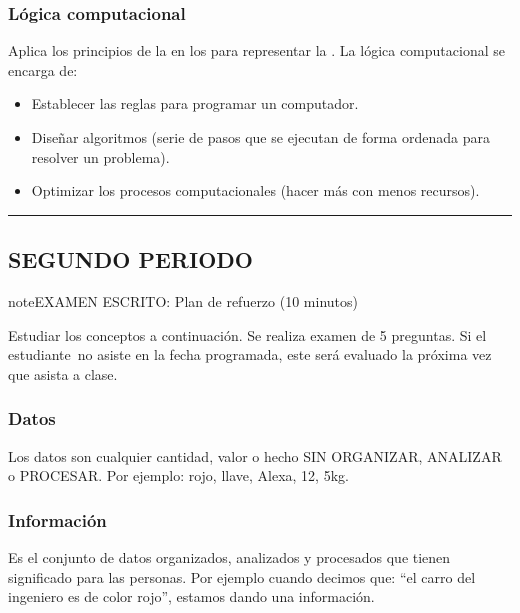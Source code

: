 \documentclass[letterpaper,10pt,spanish]{sphinxmanual}
\begin{document}
\subsubsection{Lógica computacional}
\label{\detokenize{1_guias/8logica/G829:logica-computacional}}
\sphinxAtStartPar
Aplica los principios de la  en los  para representar la . La lógica computacional se encarga de:
\begin{itemize}
\item {} 
\sphinxAtStartPar
Establecer las reglas para programar un computador.

\item {} 
\sphinxAtStartPar
Diseñar algoritmos (serie de pasos que se ejecutan de forma ordenada para resolver un problema).

\item {} 
\sphinxAtStartPar
Optimizar los procesos computacionales (hacer más con menos recursos).

\end{itemize}


\bigskip\hrule\bigskip



\subsection{SEGUNDO PERIODO}
\label{\detokenize{1_guias/8logica/G829:segundo-periodo}}
\begin{sphinxadmonition}{note}{EXAMEN ESCRITO: Plan de refuerzo (10 minutos)}

\sphinxAtStartPar
Estudiar los conceptos a continuación. Se realiza examen de 5 preguntas. Si el estudiante no asiste en la fecha programada, este será evaluado la próxima vez que asista a clase.
\end{sphinxadmonition}


\subsubsection{Datos}
\label{\detokenize{1_guias/8logica/G829:datos}}
\sphinxAtStartPar
Los datos son cualquier cantidad, valor o hecho SIN ORGANIZAR, ANALIZAR o PROCESAR. Por ejemplo: rojo, llave, Alexa, 12, 5kg.


\subsubsection{Información}
\label{\detokenize{1_guias/8logica/G829:informacion}}
\sphinxAtStartPar
Es el conjunto de datos organizados, analizados y procesados que tienen significado para las personas. Por ejemplo cuando decimos que: “el carro del ingeniero es de color rojo”, estamos dando una información.
\end{document}
